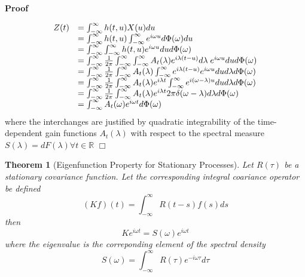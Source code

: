 \documentclass{article}
\newenvironment{proof}{\noindent\textbf{Proof\ }}{\hspace*{\fill}$\Box$\medskip}
\newtheorem{theorem}{Theorem}
\begin{document}
\begin{proof}
  
  \begin{equation}
    \begin{array}{ll}
      Z (t) & = \int_{- \infty}^{\infty} h (t, u) X (u) du\\
      & = \int_{- \infty}^{\infty} h (t, u) \int_{- \infty}^{\infty} e^{i
      \omega u} d \Phi (\omega) du\\
      & = \int_{- \infty}^{\infty} \int_{- \infty}^{\infty} h (t, u) e^{i
      \omega u} dud \Phi (\omega)\\
      & = \int_{- \infty}^{\infty} \frac{1}{2 \pi}  \int_{- \infty}^{\infty}
      \int_{- \infty}^{\infty} A_t (\lambda) e^{i \lambda (t - u)} d \lambda
      \hspace{0.27em} e^{i \omega u} dud \Phi (\omega)\\
      & = \int_{- \infty}^{\infty} \frac{1}{2 \pi}  \int_{- \infty}^{\infty}
      A_t (\lambda) \int_{- \infty}^{\infty} e^{i \lambda (t - u)} e^{i \omega
      u} du d \lambda d \Phi (\omega)\\
      & = \int_{- \infty}^{\infty} \frac{1}{2 \pi}  \int_{- \infty}^{\infty}
      A_t (\lambda) e^{i \lambda t} \int_{- \infty}^{\infty} e^{i (\omega -
      \lambda) u} dud \lambda d \Phi (\omega)\\
      & = \int_{- \infty}^{\infty} \frac{1}{2 \pi}  \int_{- \infty}^{\infty}
      A_t (\lambda) e^{i \lambda t} 2 \pi \delta (\omega - \lambda) d \lambda
      d \Phi (\omega)\\
      & = \int_{- \infty}^{\infty} A_t (\omega) e^{i \omega t} d \Phi
      (\omega)
    \end{array}
  \end{equation}
  where the interchanges are justified by quadratic integrability of the
  time-dependent gain functions $A_t (\lambda)$ with respect to the spectral
  measure $S (\lambda) = d F (\lambda) \forall t \in \mathbb{R}$
\end{proof}

\begin{theorem}[Eigenfunction Property for Stationary Processes]
  Let $R (\tau)$ be a stationary covariance function. Let the corresponding
  integral coariance operator be defined
  \begin{equation}
    (Kf) (t) = \int_{- \infty}^{\infty} R (t - s) f (s) ds
  \end{equation}
  then
  \begin{equation}
    Ke^{i \omega t} = S (\omega) e^{i \omega t}
  \end{equation}
  where the eigenvalue is the correponding element of the spectral density
  \begin{equation}
    S (\omega) = \int_{- \infty}^{\infty} R (\tau) e^{- i \omega \tau} d \tau
  \end{equation}
\end{theorem}
\end{document}
